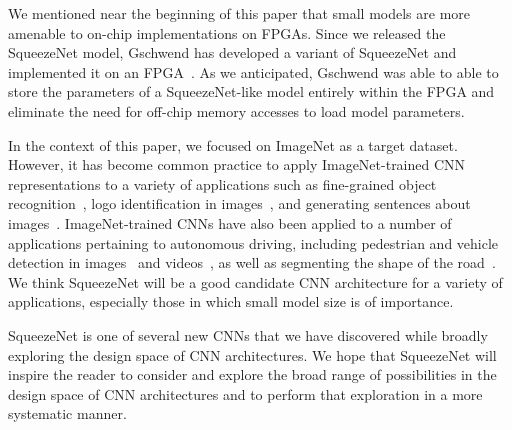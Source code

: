 \documentclass{article} %
\renewcommand{\cite}{\citep}
\begin{document}
We mentioned near the beginning of this paper that small models are more amenable to on-chip implementations on FPGAs.
Since we released the SqueezeNet model, Gschwend has developed a variant of SqueezeNet and implemented it on an FPGA~\cite{ZynqNet}.
As we anticipated, Gschwend was able to able to store the parameters of a SqueezeNet-like model entirely within the FPGA and eliminate the need for off-chip memory accesses to load model parameters.

In the context of this paper, we focused on ImageNet as a target dataset.
However, it has become common practice to apply ImageNet-trained CNN representations to a variety of applications such as fine-grained object recognition~\cite{DPD, decaf}, logo identification in images~\cite{DeepLogo}, and generating sentences about images~\cite{forrestMicrosoft}.
ImageNet-trained CNNs have also been applied to a number of applications pertaining to autonomous driving, including pedestrian and vehicle detection in images~\cite{DenseNet,DPMareCNN,Ashraf2016} and videos~\cite{Urtasun2015}, as well as segmenting the shape of the road~\cite{SegNet}. 
We think SqueezeNet will be a good candidate CNN architecture for a variety of applications, especially those in which small model size is of importance.

SqueezeNet is one of several new CNNs that we have discovered while broadly exploring the design space of CNN architectures.
We hope that SqueezeNet will inspire the reader to consider and explore the broad range of possibilities in the design space of CNN architectures and to perform that exploration in a more systematic manner.







\end{document}
